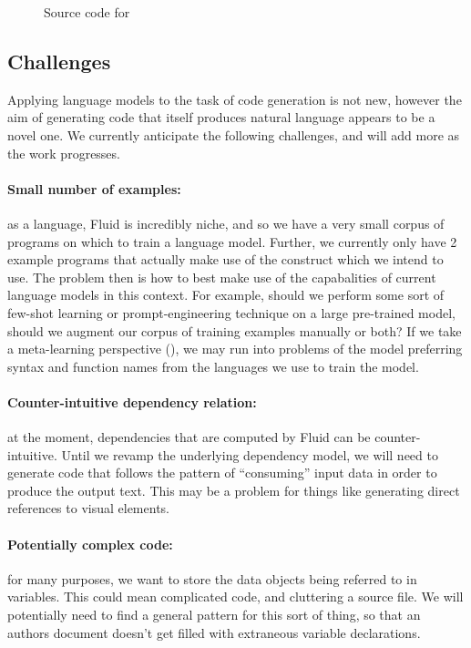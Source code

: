 \begin{figure}
   \tiny
   
   \caption{Source code for }
\end{figure}

\subsection{Challenges}
Applying language models to the task of code generation is not new, however the aim of generating code that
itself produces natural language appears to be a novel one. We currently anticipate the following challenges,
and will add more as the work progresses.

\paragraph{Small number of examples:} as a language, Fluid is incredibly niche, and so we have a very small corpus
of programs on which to train a language model. Further, we currently only have 2 example programs that actually make
use of the  construct which we intend to use. The problem then is how to best make use of the capabalities
of current language models in this context. For example, should we perform some sort of few-shot learning or prompt-engineering
technique on a large pre-trained model, should we augment our corpus of training examples manually or both? If we take a meta-learning
perspective (), we may run into problems of the model preferring syntax and function names from the languages we use to
train the model.

\paragraph{Counter-intuitive dependency relation:} at the moment, dependencies that are computed by Fluid can be counter-intuitive.
Until we revamp the underlying dependency model, we will need to generate code that follows the pattern of ``consuming'' input
data in order to produce the output text. This may be a problem for things like generating direct references to visual elements.

\paragraph{Potentially complex code:} for many purposes, we want to store the data objects being referred to in variables. This 
could mean complicated code, and cluttering a source file. We will potentially need to find a general pattern for this sort of thing,
so that an authors document doesn't get filled with extraneous variable declarations. 